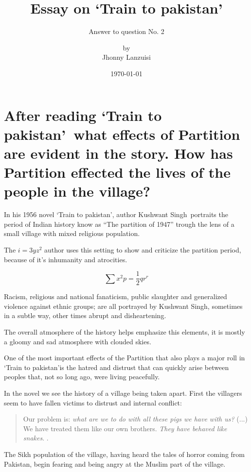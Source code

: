 \documentclass{scrartcl}
\begin{document}
%
\newcommand{\tpak}{`Train to pakistan'}
\newcommand{\ks}{Kushwant Singh}
\title{Essay on \tpak}
\subtitle{Answer to question No. 2}
\subject{IDE 143---El mundo de la literatura en inglés}
\titlehead{Universidad Simón Bolívar\hfill Caracas, Venezuela}
\author{by \\ Jhonny Lanzuisi}
\date{\today}
\maketitle

\section*{After reading \tpak\ what effects of Partition are evident in the story. How has Partition effected the lives of the people in the village?}
\label{sec:question}

In his 1956 novel \tpak \cite{khushwant_singh_train_1990},
author \ks\ portraits the period of Indian history know
as ``The partition of 1947'' trough the lens of a small village
with mixed religious population.

The \( i = 3yz^2\) author uses this setting to show and criticize
the partition period, because of it's inhumanity and
atrocities.

\[ \sum x^2 p = \frac12 qr^r\]

Racism, religious and national fanaticism,
public slaughter and generalized violence against ethnic groups;
are all portrayed by \ks, sometimes in a subtle way,
other times abrupt and disheartening.

The overall atmosphere of the history
helps emphasize this elements,
it is mostly a gloomy and sad atmosphere
with clouded skies.

One of the most important effects of the Partition
that also plays a major roll in \tpak is
the hatred and distrust that can quickly arise
between peoples that, not so long ago,
were living peacefully.

In the novel we see the history of a village
being taken apart.
First the villagers seem to have fallen victims
to distrust and internal conflict:
\begin{quote}
  Our problem is: \emph{what are we to do with all
    these pigs we have with us?} (...) We have treated them
  like our own brothers. \emph{They have behaved like snakes}.
  \cite[p. 171, para. 6, emphasis added by me]{khushwant_singh_train_1990}.
\end{quote}
The Sikh population of the village,
having heard the tales of horror coming from Pakistan,
begin fearing and being angry at the Muslim part of the village.
\end{document}

